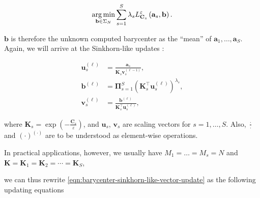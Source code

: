 \begin{equation}
  \begin{aligned}
    \operatorname*{arg\,min}_{\mathbf{b} \in \Sigma_N} \sum_{s=1}^S \lambda_s L_{\mathbf{C}_s}^\varepsilon \left(\mathbf{a}_s, \mathbf{b}\right).
  \end{aligned}
\end{equation}

$\mathbf{b}$ is therefore the unknown computed barycenter as the ``mean'' of $\mathbf{a}_1, \ldots, \mathbf{a}_S$.
Again, we will arrive at the Sinkhorn-like updates \citep{benamou2015,schmitz2018}:

\begin{equation}\label{eqn:barycenter-sinkhorn-like-vector-update}
  \begin{aligned}
    \mathbf{u}_s^{(\ell)}
     & = \frac{\mathbf{a}_s}{\mathbf{K}_s \mathbf{v}_s^{(\ell-1)}},                                   \\
    \mathbf{b}^{(\ell)}
     & = \boldsymbol{\Pi}_{s = 1}^S \left(\mathbf{K}_s^\top \mathbf{u}_s^{(\ell)}\right)^{\lambda_s}, \\
    \mathbf{v}_s^{(\ell)}
     & = \frac{\mathbf{b}^{(\ell)}}{\mathbf{K}_s^\top \mathbf{u}_s^{(\ell)}},
  \end{aligned}
\end{equation}

where $\mathbf{K}_s = \exp \left(-\frac{\mathbf{C}_s}{\varepsilon}\right)$,
and $\mathbf{u}_s$, $\mathbf{v}_s$ are scaling vectors for $s = 1, \ldots, S$.
Also, $\frac\cdot\cdot$ and $\left(\cdot\right)^{(\cdot)}$ are to be understood as element-wise operations.

In practical applications, however,
we usually have $M_1 = \ldots = M_s = N$
and $\mathbf{K} = \mathbf{K}_1 = \mathbf{K}_2 = \cdots = \mathbf{K}_S$,

we can thus rewrite \cref{eqn:barycenter-sinkhorn-like-vector-update} as
the following updating equations

